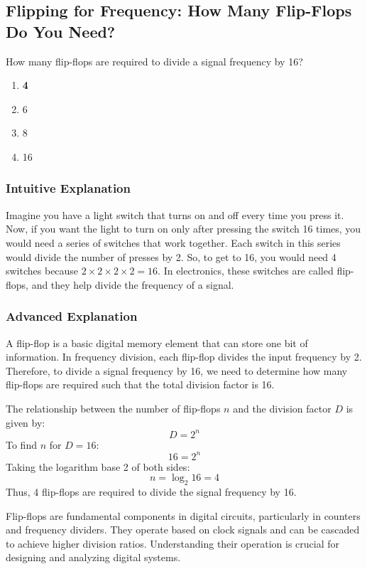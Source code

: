 \subsection{Flipping for Frequency: How Many Flip-Flops Do You Need?}

\begin{tcolorbox}[colback=gray!10!white,colframe=black!75!black,title=E7A04] How many flip-flops are required to divide a signal frequency by 16?
    \begin{enumerate}[label=\Alph*.]
        \item \textbf{4}
        \item 6
        \item 8
        \item 16
    \end{enumerate}
\end{tcolorbox}

\subsubsection{Intuitive Explanation}
Imagine you have a light switch that turns on and off every time you press it. Now, if you want the light to turn on only after pressing the switch 16 times, you would need a series of switches that work together. Each switch in this series would divide the number of presses by 2. So, to get to 16, you would need 4 switches because \(2 \times 2 \times 2 \times 2 = 16\). In electronics, these switches are called flip-flops, and they help divide the frequency of a signal.

\subsubsection{Advanced Explanation}
A flip-flop is a basic digital memory element that can store one bit of information. In frequency division, each flip-flop divides the input frequency by 2. Therefore, to divide a signal frequency by 16, we need to determine how many flip-flops are required such that the total division factor is 16.

The relationship between the number of flip-flops \(n\) and the division factor \(D\) is given by:
\[
D = 2^n
\]
To find \(n\) for \(D = 16\):
\[
16 = 2^n
\]
Taking the logarithm base 2 of both sides:
\[
n = \log_2{16} = 4
\]
Thus, 4 flip-flops are required to divide the signal frequency by 16.

Flip-flops are fundamental components in digital circuits, particularly in counters and frequency dividers. They operate based on clock signals and can be cascaded to achieve higher division ratios. Understanding their operation is crucial for designing and analyzing digital systems.

